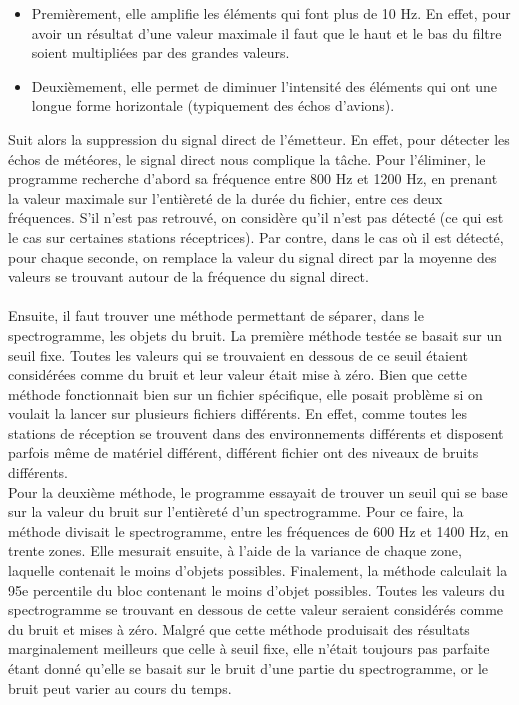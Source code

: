 \documentclass[11pt]{article}
\begin{document}
\begin{itemize}
    \item Premièrement, elle amplifie les éléments qui font plus de 10 Hz.
          En effet, pour avoir un résultat d'une valeur maximale il faut que le haut et le bas du filtre soient multipliées par des grandes valeurs.
    \item Deuxièmement, elle permet de diminuer l'intensité des éléments qui ont une longue forme horizontale (typiquement des échos d'avions).
\end{itemize}

Suit alors la suppression du signal direct de l'émetteur.
En effet, pour détecter les échos de météores, le signal direct nous complique la tâche.
Pour l'éliminer, le programme recherche d'abord sa fréquence entre 800 Hz et 1200 Hz, en prenant la valeur maximale sur l'entièreté de la durée du fichier, entre ces deux fréquences.
S'il n'est pas retrouvé, on considère qu'il n'est pas détecté (ce qui est le cas sur certaines stations réceptrices).
Par contre, dans le cas où il est détecté, pour chaque seconde, on remplace la valeur du signal direct par la moyenne des valeurs se trouvant autour de la fréquence du signal direct.\\
\\
Ensuite, il faut trouver une méthode permettant de séparer, dans le spectrogramme, les objets du bruit.
La première méthode testée se basait sur un seuil fixe.
Toutes les valeurs qui se trouvaient en dessous de ce seuil étaient considérées comme du bruit et leur valeur était mise à zéro.
Bien que cette méthode fonctionnait bien sur un fichier spécifique, elle posait problème si on voulait la lancer sur plusieurs fichiers différents.
En effet, comme toutes les stations de réception se trouvent dans des environnements différents et disposent parfois même de matériel différent, différent fichier ont des niveaux de bruits différents.\\
Pour la deuxième méthode, le programme essayait de trouver un seuil qui se base sur la valeur du bruit sur l'entièreté d'un spectrogramme.
Pour ce faire, la méthode divisait le spectrogramme, entre les fréquences de 600 Hz et 1400 Hz, en trente zones.
Elle mesurait ensuite, à l'aide de la variance de chaque zone, laquelle contenait le moins d'objets possibles.
Finalement, la méthode calculait la 95e percentile du bloc contenant le moins d'objet possibles.
Toutes les valeurs du spectrogramme se trouvant en dessous de cette valeur seraient considérés comme du bruit et mises à zéro.
Malgré que cette méthode produisait des résultats marginalement meilleurs que celle à seuil fixe, elle n'était toujours pas parfaite étant donné qu'elle se basait sur le bruit d'une partie du spectrogramme, or le bruit peut varier au cours du temps.\\
\end{document}
